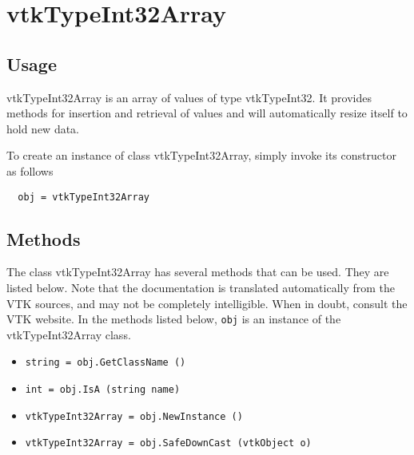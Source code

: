 \section{vtkTypeInt32Array}

\subsection{Usage}

 vtkTypeInt32Array is an array of values of type vtkTypeInt32.  It
 provides methods for insertion and retrieval of values and will
 automatically resize itself to hold new data.

To create an instance of class vtkTypeInt32Array, simply
invoke its constructor as follows
\begin{verbatim}
  obj = vtkTypeInt32Array
\end{verbatim}
\subsection{Methods}

The class vtkTypeInt32Array has several methods that can be used.
  They are listed below.
Note that the documentation is translated automatically from the VTK sources,
and may not be completely intelligible.  When in doubt, consult the VTK website.
In the methods listed below, \verb|obj| is an instance of the vtkTypeInt32Array class.
\begin{itemize}
\item  \verb|string = obj.GetClassName ()|

\item  \verb|int = obj.IsA (string name)|

\item  \verb|vtkTypeInt32Array = obj.NewInstance ()|

\item  \verb|vtkTypeInt32Array = obj.SafeDownCast (vtkObject o)|

\end{itemize}
